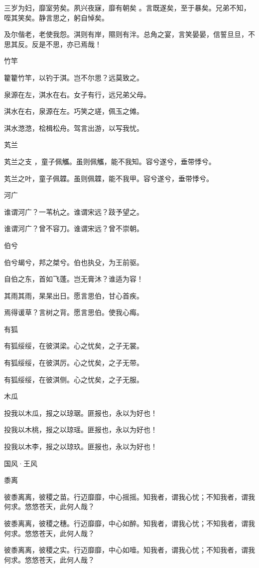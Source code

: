 三岁为妇，靡室劳矣。夙兴夜寐，靡有朝矣 。言既遂矣，至于暴矣。兄弟不知，咥其笑矣。静言思之，躬自悼矣。

及尔偕老，老使我怨。淇则有岸，隰则有泮。总角之宴，言笑晏晏，信誓旦旦，不思其反。反是不思，亦已焉哉！

竹竿

籊籊竹竿，以钓于淇。岂不尔思？远莫致之。

泉源在左，淇水在右。女子有行，远兄弟父母。

淇水在右，泉源在左。巧笑之瑳，佩玉之傩。

淇水滺滺，桧楫松舟。驾言出游，以写我忧。

芄兰

芄兰之支 ，童子佩觿。虽则佩觿，能不我知。容兮遂兮，垂带悸兮。

芄兰之叶，童子佩韘。虽则佩韘，能不我甲。容兮遂兮，垂带悸兮。

河广

谁谓河广？一苇杭之。谁谓宋远？跂予望之。

谁谓河广？曾不容刀。谁谓宋远？曾不崇朝。

伯兮

伯兮朅兮，邦之桀兮。伯也执殳，为王前驱。

自伯之东，首如飞蓬。岂无膏沐？谁适为容！

其雨其雨，杲杲出日。愿言思伯，甘心首疾。

焉得谖草？言树之背。愿言思伯。使我心痗。

有狐

有狐绥绥，在彼淇梁。心之忧矣，之子无裳。

有狐绥绥，在彼淇厉。心之忧矣，之子无带。

有狐绥绥，在彼淇侧。心之忧矣，之子无服。

木瓜

投我以木瓜，报之以琼琚。匪报也，永以为好也！

投我以木桃，报之以琼瑶。匪报也，永以为好也！

投我以木李，报之以琼玖。匪报也，永以为好也！




国风·王风


黍离

彼黍离离，彼稷之苗。行迈靡靡，中心摇摇。知我者，谓我心忧；不知我者，谓我何求。悠悠苍天，此何人哉？

彼黍离离，彼稷之穗。行迈靡靡，中心如醉。知我者，谓我心忧；不知我者，谓我何求。悠悠苍天，此何人哉？

彼黍离离，彼稷之实。行迈靡靡，中心如噎。知我者，谓我心忧；不知我者，谓我何求。悠悠苍天，此何人哉？

